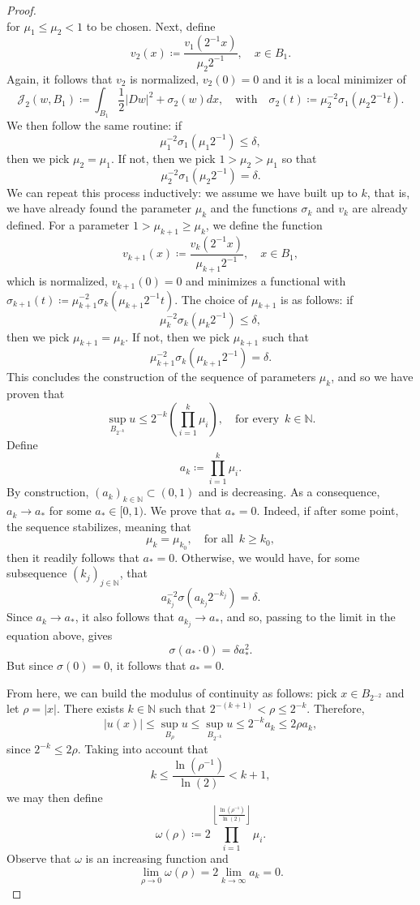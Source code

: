 \documentclass[reqno,11pt]{amsart}
\newcommand{\1}{\mathds{1}}  %
\numberwithin{equation}{section}
\begin{document}
\begin{proof}
$$$$
for $\mu_1 \leq \mu_2 < 1$ to be chosen. Next, define
$$
    v_2(x) \coloneqq \frac{v_1\left(2^{-1}x\right)}{\mu_2 2^{-1}}, \quad x \in B_1.
$$
Again, it follows that $v_2$ is normalized, $v_2(0) = 0$ and it is a local minimizer of
$$
    \mathcal{J}_2(w,B_1) \coloneqq \int_{B_1} \frac12 |Dw|^2 + \sigma_2(w)dx, \quad \text{with} \quad \sigma_2(t) \coloneqq \mu_2^{-2}\sigma_1\left(\mu_2 2^{-1} t\right).
$$
We then follow the same routine: if
$$
    \mu_1^{-2}\sigma_1\left(\mu_1 2^{-1} \right) \leq \delta,
$$
then we pick $\mu_2 = \mu_1$. If not, then we pick $1 > \mu_2 > \mu_1$ so that
$$
   \mu_2^{-2}\sigma_1\left(\mu_2 2^{-1}\right) = \delta. 
$$
We can repeat this process inductively: we assume we have built up to $k$, that is, we have already found the parameter $\mu_k$ and the functions $\sigma_k$ and $v_k$ are already defined. For a parameter $1 > \mu_{k+1} \geq \mu_k$, we define the function
$$
    v_{k+1}(x) \coloneqq \frac{v_{k}(2^{-1}x)}{\mu_{k+1}2^{-1}}, \quad x \in B_1,
$$
which is normalized, $v_{k+1}(0) = 0$ and minimizes a functional with $\sigma_{k+1}(t) \coloneqq \mu_{k+1}^{-2}\sigma_k(\mu_{k+1}2^{-1}t)$. The choice of $\mu_{k+1}$ is as follows: if
$$
    \mu_{k}^{-2}\sigma_k(\mu_{k}2^{-1}) \leq \delta,
$$
then we pick $\mu_{k+1} = \mu_k$. If not, then we pick $\mu_{k+1}$ such that
$$
    \mu_{k+1}^{-2}\sigma_k\left(\mu_{k+1} 2^{-1}\right) = \delta.
$$
This concludes the construction of the sequence of parameters $\mu_k$, and so we have proven that
$$
    \sup_{B_{2^{-k}}}u \leq 2^{-k}\left(\prod_{i=1}^{k}\mu_i\right), \quad \text{for every }\, k \in \mathbb{N}.
$$
Define
$$
    a_k \coloneqq \prod_{i=1}^{k}\mu_i.
$$
By construction, $(a_k)_{k \in \mathbb{N}} \subset (0,1)$ and is decreasing. As a consequence, $a_k \to a_{\ast}$ for some $a_{\ast} \in [0,1)$. We prove that $a_{\ast} = 0$. Indeed, if after some point, the sequence stabilizes, meaning that
$$
    \mu_k = \mu_{k_0}, \quad \text{for all }\, k \geq k_0,
$$
then it readily follows that $a_{\ast} = 0$. Otherwise, we would have, for some subsequence $(k_j)_{j \in \mathbb{N}}$, that
$$
    a_{k_j}^{-2}\sigma(a_{k_j}2^{-k_j}) = \delta.
$$
Since $a_k \to a_{\ast}$, it also follows that $a_{k_j} \to a_{\ast}$, and so, passing to the limit in the equation above, gives
$$
    \sigma(a_{\ast} \cdot 0) = \delta a_{\ast}^2.
$$
But since $\sigma(0) = 0$, it follows that $a_{\ast} = 0$. 

From here, we can build the modulus of continuity as follows: pick $x \in B_{2^{-2}}$ and let $\rho = |x|$. There exists $k \in \mathbb{N}$ such that $2^{-(k+1)} < \rho \leq 2^{-k}$. Therefore, 
$$
    |u(x)| \leq \sup_{B_{\rho}} u \leq \sup_{B_{2^{-k}}}u \leq 2^{-k} a_k \leq 2\rho a_k,
$$
since $2^{-k} \leq 2\rho$. Taking into account that
$$
    k \leq \frac{\ln\left(\rho^{-1}\right)}{\ln(2)} < k+1,
$$
we may then define
$$
     \omega(\rho) \coloneqq 2 \prod_{i=1}^{\left\lfloor{\frac{\ln(\rho^{-1})}{\ln(2)}}\right\rfloor} \mu_i.
$$
Observe that $\omega$ is an increasing function and 
$$
    \lim_{\rho \to 0} \omega(\rho) = 2 \lim_{k \to \infty} a_k = 0.
$$
\end{proof}
\end{document}
